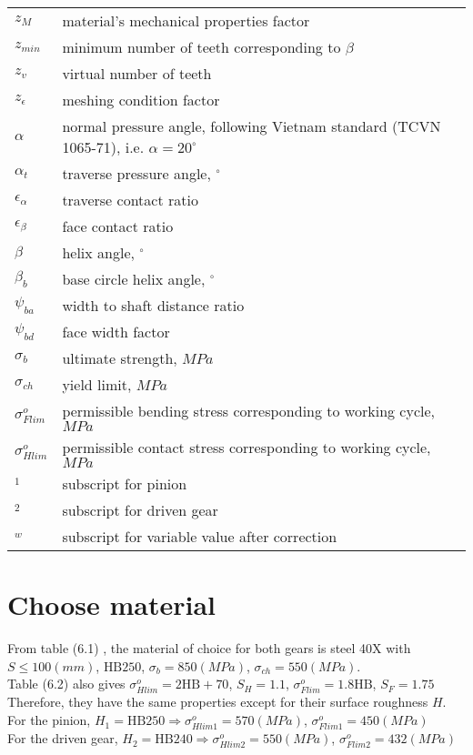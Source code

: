 \begin{tabular}[t]{lp{7cm}}
	$ z_M $ & material's mechanical properties factor \\
	$ z_{min} $ & minimum number of teeth corresponding to $ \beta $\\
	$ z_v $ & virtual number of teeth\\
	$ z_\epsilon $ & meshing condition factor\\
	$ \alpha $ & normal pressure angle, following Vietnam standard (TCVN 1065-71), i.e. $ \alpha = 20^\circ $\\
	$ \alpha_t $ & traverse pressure angle, $ ^\circ $\\
	$ \epsilon_\alpha $ & traverse contact ratio\\
	$ \epsilon_\beta $ & face contact ratio\\
	$ \beta $ & helix angle, $ ^\circ $\\
	$ \beta_b $ & base circle helix angle, $ ^\circ $\\
	$ \psi_{ba} $ & width to shaft distance ratio\\
	$ \psi_{bd} $ & face width factor \\
	$ \sigma_b $ & ultimate strength, $ MPa $\\
	$ \sigma_{ch} $ & yield limit, $ MPa $\\
	$ \sigma_{Flim}^o $ & permissible bending stress corresponding to working cycle, $ MPa $\\
	$ \sigma_{Hlim}^o $ & permissible contact stress corresponding to working cycle, $ MPa $\\
	$ _1 $ & subscript for pinion\\
	$ _2 $ & subscript for driven gear\\
	$ _w $ & subscript for variable value after correction\\
\end{tabular}

\section{Choose material}
From table (6.1) , the material of choice for both gears is steel 40X with $ S\leq100\unit{(mm)} $, $ \text{HB} 250 $, $ \sigma_b = 850\unit{(MPa)} $, $ \sigma_{ch} = 550 \unit{(MPa)}$.\\
Table (6.2)  also gives $ \sigma_{Hlim}^o = 2\text{HB} + 70$, $ S_H = 1.1 $, $ \sigma_{Flim}^o = 1.8\text{HB} $, $ S_F = 1.75 $\\
Therefore, they have the same properties except for their surface roughness $ H $.\\
For the pinion, $ H_1=\text{HB}250 \Rightarrow \sigma_{Hlim1}^o = 570\unit{(MPa)}$, $ \sigma_{Flim1}^o = 450\unit{(MPa)}$\\
For the driven gear, $ H_2=\text{HB}240 \Rightarrow \sigma_{Hlim2}^o = 550\unit{(MPa)}$, $ \sigma_{Flim2}^o = 432\unit{(MPa)}$
